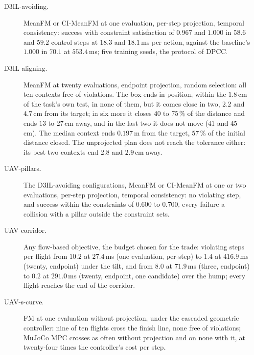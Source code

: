 \begin{description}
  \item[D3IL-avoiding.] MeanFM or CI-MeanFM at one evaluation, per-step projection, temporal consistency:
    success with constraint satisfaction of $0.967$ and $1.000$ in $58.6$ and $59.2$ control steps at $18.3$
    and $18.1$\,ms per action, against the baseline's $1.000$ in $70.1$ at $553.4$\,ms; five training seeds,
    the protocol of \ac{DPCC}.
  \item[D3IL-aligning.] MeanFM at twenty evaluations, endpoint projection, random selection: all ten contexts
    free of violations. The box ends in position, within the $1.8$\,cm of the task's own test, in none of
    them, but it comes close in two, $2.2$ and $4.7$\,cm from its target; in six more it closes $40$ to
    $75\,\%$ of the distance and ends $13$ to $27$\,cm away, and in the last two it does not move ($41$ and
    $45$\,cm). The median context ends $0.197$\,m from the target, $57\,\%$ of the initial distance closed.
    The unprojected plan does not reach the tolerance either: its best two contexts end $2.8$ and $2.9$\,cm
    away.
  \item[UAV-pillars.] The D3IL-avoiding configurations, MeanFM or CI-MeanFM at one or two evaluations,
    per-step projection, temporal consistency: no violating step, and success within the constraints of
    $0.600$ to $0.700$, every failure a collision with a pillar outside the constraint sets.
  \item[UAV-corridor.] Any flow-based objective, the budget chosen for the trade: violating steps per flight
    from $10.2$ at $27.4$\,ms (one evaluation, per-step) to $1.4$ at $416.9$\,ms (twenty, endpoint) under the
    tilt, and from $8.0$ at $71.9$\,ms (three, endpoint) to $0.2$ at $291.0$\,ms (twenty, endpoint, one
    candidate) over the hump; every flight reaches the end of the corridor.
  \item[UAV-s-curve.] FM at one evaluation without projection, under the cascaded geometric controller: nine
    of ten flights cross the finish line, none free of violations; MuJoCo MPC crosses as often without
    projection and on none with it, at twenty-four times the controller's cost per step.
\end{description}
